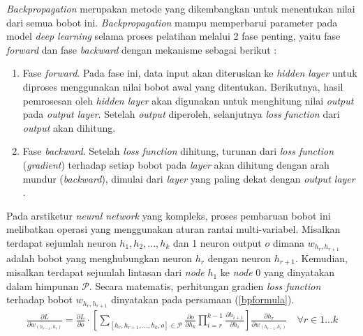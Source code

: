 \documentclass[a4paper,12pt]{report}
\begin{document}
\textit{Backpropagation} merupakan metode yang dikembangkan untuk menentukan nilai dari semua bobot ini. \textit{Backpropagation} mampu memperbarui parameter pada model \textit{deep learning} selama proses pelatihan melalui 2 fase penting, yaitu fase \textit{forward} dan fase \textit{backward} dengan mekanisme sebagai berikut \cite{montesinoslopezMultivariateStatisticalMachine2022}\cite{pajankarHandsonMachineLearning2022}: 
\begin{enumerate}
	\item Fase \textit{forward}. Pada fase ini, data input akan diteruskan ke \textit{hidden layer} untuk diproses menggunakan nilai bobot awal yang ditentukan. Berikutnya, hasil pemrosesan oleh \textit{hidden layer} akan digunakan untuk menghitung nilai \textit{output} pada \textit{output layer}. Setelah \textit{output} diperoleh, selanjutnya \textit{loss function} dari \textit{output} akan dihitung.
	\item Fase \textit{backward}. Setelah \textit{loss function} dihitung, turunan dari \textit{loss function} (\textit{gradient}) terhadap setiap bobot pada \textit{layer} akan dihitung dengan arah mundur (\textit{backward}), dimulai dari \textit{layer} yang paling dekat dengan \textit{output layer} \cite{aggarwalNeuralNetworksDeep2018}.  
\end{enumerate}

Pada arstiketur \textit{neural network} yang kompleks, proses pembaruan bobot ini melibatkan operasi yang menggunakan aturan rantai multi-variabel. Misalkan terdapat sejumlah neuron $h_1, h_2, ..., h_k$ dan 1 neuron output $o$ dimana $w_{h_r, h_{r+1}}$ adalah bobot yang menghubungkan neuron $h_r$ dengan neuron $h_{r+1}$. Kemudian, misalkan terdapat sejumlah lintasan dari \textit{node} $h_1$ ke \textit{node} $0$ yang dinyatakan dalam himpunan $\mathcal{P}$. Secara matematis, perhitungan gradien \textit{loss function} terhadap bobot $w_{h_r, h_{r+1}}$ dinyatakan pada persamaan (\ref{bpformula}).
\begin{equation}
	\begin{split}
		\frac{\partial L}{\partial w_{(h_{r-1},h_r)}} = \frac{\partial L}{\partial o} \cdot \left[ \sum_{[h_r, h_{r+1}, ..., h_{k}, o] \in \mathcal{P}} \frac{\partial o}{\partial h_k} \prod_{i=r}^{k-1} \frac{\partial h_{i+1}}{\partial h_i} \right] \frac{\partial h_r}{\partial w_{(h_{r-1},h_r)}} \quad \forall r \in 1...k \\
	\end{split}
	\label{bpformula}
\end{equation}
\end{document}
